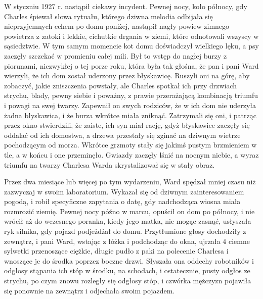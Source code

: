 W styczniu 1927 r. nastąpił ciekawy incydent. Pewnej nocy, koło północy, gdy Charles śpiewał słowa rytuału, którego dziwna melodia odbijała się nieprzyjemnych echem po domu poniżej, nastąpił nagły powiew zimnego powietrza z zatoki i lekkie, cichutkie drgania w ziemi, które odnotowali wszyscy w sąsiedztwie. W tym samym momencie kot domu doświadczył wielkiego lęku, a psy zaczęły szczekać w promieniu całej mili. Był to wstęp do nagłej burzy z piorunami, niezwykłej o tej porze roku, która była tak głośna, że pan i pani Ward wierzyli, że ich dom został uderzony przez błyskawicę. Ruszyli oni na górę, aby zobaczyć, jakie zniszczenia powstały, ale Charles spotkał ich przy drzwiach strychu, blady, pewny siebie i poważny, z prawie przerażającą kombinacją triumfu i powagi na swej twarzy. Zapewnił on swych rodziców, że w ich dom nie uderzyła żadna błyskawica, i że burza wkrótce miała zniknąć. Zatrzymali się oni, i patrząc przez okno stwierdzili, że zaiste, ich syn miał rację, gdyż błyskawice zaczęły się oddalać od ich domostwa, a drzewa przestały się zginać na dziwnym wietrze pochodzącym od morza. Wkrótce grzmoty stały się jakimś pustym brzmieniem w tle, a w końcu i one przeminęło. Gwiazdy zaczęły lśnić na nocnym niebie, a wyraz triumfu na twarzy Charlesa Warda skrystalizował się w stały obraz. 

Przez dwa miesiące lub więcej po tym wydarzeniu, Ward spędzał mniej czasu niż zazwyczaj w swoim laboratorium. Wykazał się od dziwnym zainteresowaniem pogodą, i robił specyficzne zapytania o datę, gdy nadchodząca wiosna miała rozmrozić ziemię. Pewnej nocy późno w marcu, opuścił on dom po północy, i nie wrócił aż do wczesnego poranka, kiedy jego matka, nie mogąc zasnąć, usłyszała ryk silnika, gdy pojazd podjeżdżał do domu. Przytłumione głosy dochodziły z zewnątrz, i pani Ward, wstając z łóżka i podchodząc do okna, ujrzała 4 ciemne sylwetki przenoszące ciężkie, długie pudło z paki na polecenie Charlesa i wnoszące je do środka poprzez boczne drzwi. Słyszała ona oddechy robotników i odgłosy stąpania ich stóp w środku, na schodach, i ostatecznie, pusty odgłos ze strychu, po czym znowu rozległy się odgłosy stóp, i czwórka mężczyzn pojawiła się ponownie na zewnątrz i odjechała swoim pojazdem.  

